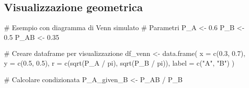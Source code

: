 \documentclass[
  letterpaper,
  DIV=11,
  numbers=noendperiod,
  oneside]{scrreprt}
\newenvironment{Shaded}{\begin{snugshade}}{\end{snugshade}}
\newcommand{\AttributeTok}[1]{\textcolor[rgb]{0.40,0.45,0.13}{#1}}
\newcommand{\CommentTok}[1]{\textcolor[rgb]{0.37,0.37,0.37}{#1}}
\newcommand{\FloatTok}[1]{\textcolor[rgb]{0.68,0.00,0.00}{#1}}
\newcommand{\FunctionTok}[1]{\textcolor[rgb]{0.28,0.35,0.67}{#1}}
\newcommand{\NormalTok}[1]{\textcolor[rgb]{0.00,0.23,0.31}{#1}}
\newcommand{\OtherTok}[1]{\textcolor[rgb]{0.00,0.23,0.31}{#1}}
\newcommand{\SpecialCharTok}[1]{\textcolor[rgb]{0.37,0.37,0.37}{#1}}
\newcommand{\StringTok}[1]{\textcolor[rgb]{0.13,0.47,0.30}{#1}}
\theoremstyle{definition}
\theoremstyle{plain}
\theoremstyle{definition}
\theoremstyle{remark}
\begin{document}
\subsection{Visualizzazione
geometrica}\label{visualizzazione-geometrica}

\begin{Shaded}
\begin{Highlighting}[]
\CommentTok{\# Esempio con diagramma di Venn simulato}
\CommentTok{\# Parametri}
\NormalTok{P\_A }\OtherTok{\textless{}{-}} \FloatTok{0.6}
\NormalTok{P\_B }\OtherTok{\textless{}{-}} \FloatTok{0.5}
\NormalTok{P\_AB }\OtherTok{\textless{}{-}} \FloatTok{0.35}

\CommentTok{\# Creare dataframe per visualizzazione}
\NormalTok{df\_venn }\OtherTok{\textless{}{-}} \FunctionTok{data.frame}\NormalTok{(}
  \AttributeTok{x =} \FunctionTok{c}\NormalTok{(}\FloatTok{0.3}\NormalTok{, }\FloatTok{0.7}\NormalTok{),}
  \AttributeTok{y =} \FunctionTok{c}\NormalTok{(}\FloatTok{0.5}\NormalTok{, }\FloatTok{0.5}\NormalTok{),}
  \AttributeTok{r =} \FunctionTok{c}\NormalTok{(}\FunctionTok{sqrt}\NormalTok{(P\_A }\SpecialCharTok{/}\NormalTok{ pi), }\FunctionTok{sqrt}\NormalTok{(P\_B }\SpecialCharTok{/}\NormalTok{ pi)),}
  \AttributeTok{label =} \FunctionTok{c}\NormalTok{(}\StringTok{"A"}\NormalTok{, }\StringTok{"B"}\NormalTok{)}
\NormalTok{)}

\CommentTok{\# Calcolare condizionata}
\NormalTok{P\_A\_given\_B }\OtherTok{\textless{}{-}}\NormalTok{ P\_AB }\SpecialCharTok{/}\NormalTok{ P\_B}


\end{Highlighting}
\end{Shaded}
\end{document}
